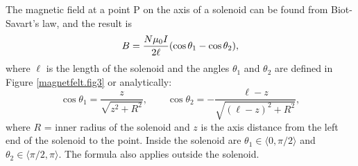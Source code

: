 \documentclass[../Elmag-labhefte-2020.tex]{subfiles}
\begin{document}
The magnetic field at a point P on the axis of a solenoid can be found from Biot-Savart's law, and the result is
\begin{equation}
    B = \frac{N \mu_0 I} {2 \ell} \qty(\cos\theta_1 - \cos\theta_2),
    \label{eq:solenoide}
\end{equation}
where $\ell$ is the length of the solenoid and the angles $\theta_1$ and $\theta_2$ are defined in Figure \ref{magnetfelt.fig3} or analytically:
\begin{equation}
    \cos \theta_1 = \frac{z}{\sqrt{z^2 + R^2}}, \qquad
    \cos \theta_2 = - \frac{\ell - z}{\sqrt{(\ell - z)^2 + R^2}},
\end{equation}
where $R$ = inner radius of the solenoid and $z$ is the axis distance from the left end of the solenoid to the point. Inside the solenoid are $\theta_1 \in \langle 0, \pi/2 \rangle$ and $\theta_2 \in \langle \pi/2, \pi \rangle$. The formula also applies outside the solenoid.
%
\end{document}
